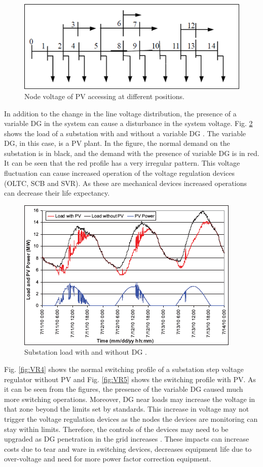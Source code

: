 \begin{figure}[!h]
\centering
\includegraphics[width=0.85\linewidth]{figs/VR1.png}
\caption[Node voltage of PV accessing at different positions]{Node voltage of PV accessing at different positions.\cite{VR1}}
\label{fig:VR2}
\end{figure}

In addition to the change in the line voltage distribution, the presence of a variable DG in the system can cause a disturbance in the system voltage. Fig. \ref{fig:VR3} shows the load of a substation with and without a variable DG \cite{GKA11}. The variable DG, in this case, is a PV plant. In the figure, the normal demand on the substation is in black, and the demand with the presence of variable DG is in red. It can be seen that the red profile has a very irregular pattern. This voltage fluctuation can cause increased operation of the voltage regulation devices (OLTC, SCB and SVR). As these are mechanical devices increased operations can decrease their life expectancy.
 
\begin{figure}[!h]
\centering
\includegraphics[width=0.7\linewidth]{figs/VR3.png}
\caption[Substation load with and without DG.]{Substation load with and without DG \cite{GKA11}.}
\label{fig:VR3}
\end{figure}
 

Fig. \ref{fig:VR4} shows the normal switching profile of a substation step voltage regulator without PV and Fig. \ref{fig:VR5} shows the switching profile with PV. As it can be seen from the figures, the presence of the variable DG caused much more switching operations. Moreover, DG near loads may increase the voltage in that zone beyond the limits set by standards. This increase in voltage may not trigger the voltage regulation devices as the nodes the devices are monitoring can stay within limits. Therefore, the controls of the devices may need to be upgraded as DG penetration in the grid increases \cite{IEE13}. These impacts can increase costs due to tear and ware in switching devices, decreases equipment life due to over-voltage and need for more power factor correction equipment. 

